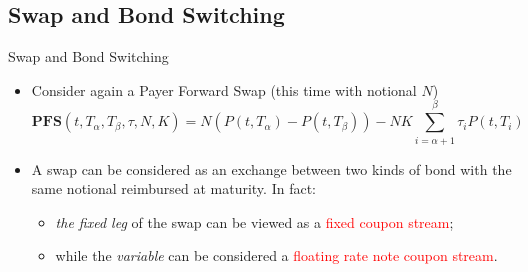 \documentclass{beamer}
\begin{document}



\subsection{Swap and Bond Switching}
\begin{frame}{Swap and Bond Switching}
	\begin{itemize}
		\item<1-> Consider again a Payer Forward Swap (this time with notional $N$)
		\begin{equation*}
			\textbf{PFS}(t,T_\alpha,T_\beta,\tau,N,K)=N(P(t,T_\alpha)-P(t,T_\beta))-NK\sum_{i=\alpha+1}^{\beta} \tau_iP(t,T_i)
		\end{equation*}
		\item<2-> A swap can be considered as an exchange between two kinds of bond with the same notional reimbursed at maturity. In fact:
		\begin{itemize}
		 \item<3->\emph{the fixed leg} of the swap can be viewed as a \textcolor{red}{fixed coupon stream};
		 \item<3-> while the \emph{variable} can be considered a \textcolor{red}{floating rate note coupon stream}. 
		\end{itemize}
	\end{itemize}
\end{frame}
\end{document}
